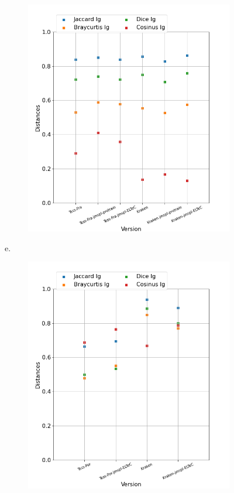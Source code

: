 \begin{figure}
\begin{minipage}{7cm}
\begin{subfigure}{0.99\textwidth}
  \includegraphics[height=.99\textwidth]{IMAGES/ELTeC_DISTANCES_spaCy3.5.1/ADAM-graph-dist-spaCy3.5.1-lg.png} 
  \vspace{-0.25cm}
  \label{fig:Adam_DIST_LG}
  \end{subfigure}
  \end{minipage}
\begin{minipage}{7cm}
e.\
  \begin{subfigure}{0.99\textwidth}
  \includegraphics[height=.99\textwidth]{IMAGES/ELTeC_DISTANCES_spaCy3.5.1/DINIZ-graph-dist-spaCy3.5.1-lg.png} 

\end{subfigure}
\end{minipage}
\end{figure}
